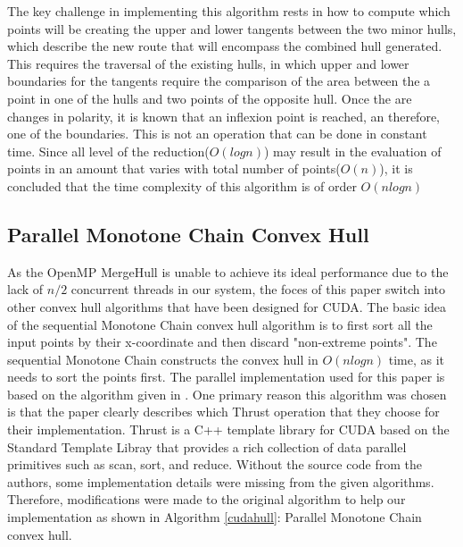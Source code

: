 \documentclass{article}
\begin{document}
The key challenge in implementing this algorithm rests in how to compute which points will be creating the upper and lower tangents between the two minor hulls, which describe the new route that will encompass the combined hull generated. This requires the traversal of the existing hulls, in which upper and lower boundaries for the tangents require the comparison of the area between the a point in one of the hulls and two points of the opposite hull. Once the are changes in polarity, it is known that an inflexion point is reached, an therefore, one of the boundaries. This is not an operation that can be done in constant time. Since all level of the reduction($O(log n)$) may result in the evaluation of points in an amount that varies with total number of points($O(n)$), it is concluded that the time complexity of this algorithm is of order $O(nlogn)$

\subsection{Parallel Monotone Chain Convex Hull}
As the OpenMP MergeHull is unable to achieve its ideal performance due to the lack of $n/2$ concurrent threads in our system, the foces of this paper switch into other convex hull algorithms that have been designed for CUDA. The basic idea of the sequential Monotone Chain convex hull algorithm is to first sort all the input points by their x-coordinate and then discard "non-extreme points"\cite{zhang2015novel}\cite{andrew1979another}. The sequential Monotone Chain constructs the convex hull in $O(nlogn)$ time, as it needs to sort the points first. The parallel implementation used for this paper is based on the algorithm given in \cite{zhang2015novel}. One primary reason this algorithm was chosen is that the paper clearly describes which Thrust operation that they choose for their implementation. Thrust is a C++ template library for CUDA based on the Standard Template Libray that provides a rich collection of data parallel primitives such as scan, sort, and reduce\cite{zhang2015novel}. Without the source code from the authors, some implementation details were missing from the given algorithms. Therefore, modifications were made to the original algorithm to help our implementation as shown in Algorithm \ref{cudahull}: Parallel Monotone Chain convex hull.
\end{document}
